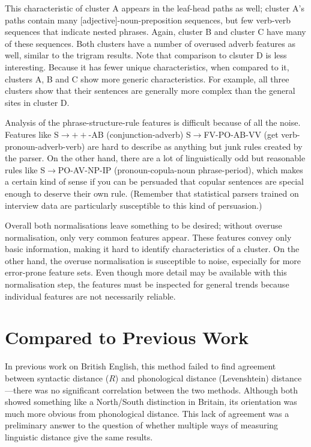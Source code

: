 This characteristic of cluster A appears in the leaf-head paths as
well; cluster A's paths contain many [adjective]-noun-preposition
sequences, but few verb-verb sequences that indicate nested
phrases. Again, cluster B and cluster C have many of these
sequences. Both clusters have a number of overused adverb features as
well, similar to the trigram results. Note that comparison to clsuter
D is less interesting. Because it has fewer unique characteristics,
when compared to it, clusters A, B and C show more generic
characteristics. For example, all three clusters show that their
sentences are generally more complex than the general sites in cluster D.

Analysis of the phrase-structure-rule features is difficult because of
all the noise. Features like S$\to++$-AB (conjunction-adverb)
S$\to$FV-PO-AB-VV (get verb-pronoun-adverb-verb) are hard to describe
as anything but junk rules created by the parser. On the other hand,
there are a lot of linguistically odd but reasonable rules like
S$\to$PO-AV-NP-IP (pronoun-copula-noun phrase-period), which makes a
certain kind of sense if you can be persuaded that copular sentences
are special enough to deserve their own rule. (Remember that
statistical parsers trained on interview data are particularly
susceptible to this kind of persuasion.)

Overall both normalisations leave something to be desired; without
overuse normalisation, only very common features appear. These
features convey only basic information, making it hard to identify
characteristics of a cluster. On the other hand, the overuse
normalisation is susceptible to noise, especially for more error-prone
feature sets. Even though more detail may be available with this
normalisation step, the features must be inspected for general trends
because individual features are not necessarily reliable.

\section{Compared to Previous Work}

In previous work on British English, this method failed to find
agreement between syntactic distance ($R$) and phonological distance
(Levenshtein) distance---there was no
significant correlation between the two methods. Although both showed
something like a North/South distinction in Britain, its orientation was much more
obvious from phonological distance. This lack of agreement was a
preliminary answer to the question of whether multiple
ways of measuring linguistic distance give the same results.

